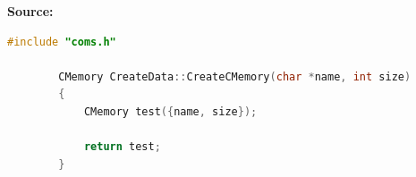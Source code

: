 \documentclass[conference]{IEEEtran}
\begin{document}
      \textbf{Source:}
      \begin{lstlisting}[language=c++]
        #include "coms.h"

        CMemory CreateData::CreateCMemory(char *name, int size)
        {
            CMemory test({name, size});

            return test;
        }
      \end{lstlisting}
  \nocite{*}
	\renewcommand\refname{\section{Reference List}}
	\small{
    }
\end{document}
